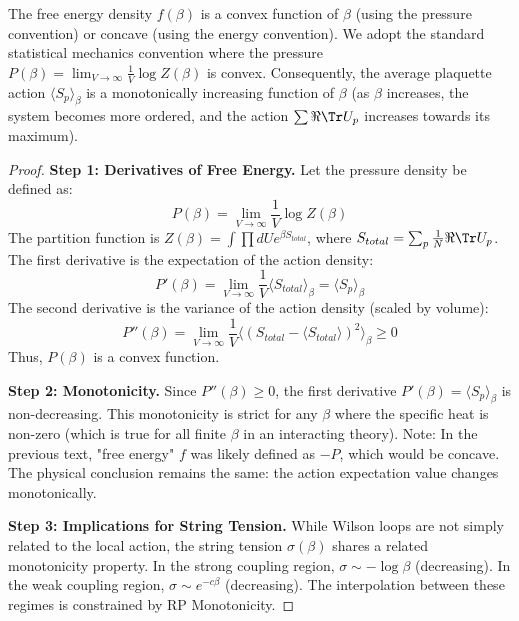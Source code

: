 \begin{theorem}
\label{thm:rp-comparison}
\label{thm:rp-monotonicity}
The free energy density $f(\beta)$ is a convex function of $\beta$ (using the pressure convention) or concave (using the energy convention). We adopt the standard statistical mechanics convention where the pressure $P(\beta) = \lim_{V \to \infty} \frac{1}{V} \log Z(\beta)$ is convex. Consequently, the average plaquette action $\langle S_p \rangle_\beta$ is a monotonically increasing function of $\beta$ (as $\beta$ increases, the system becomes more ordered, and the action $\sum \Re \Tr U_p$ increases towards its maximum).
\end{theorem}

\begin{proof}
\textbf{Step 1: Derivatives of Free Energy.}
Let the pressure density be defined as:
\begin{equation}
P(\beta) = \lim_{V \to \infty} \frac{1}{V} \log Z(\beta)
\end{equation}
The partition function is $Z(\beta) = \int \prod dU e^{\beta S_{total}}$, where $S_{total} = \sum_p \frac{1}{N} \Re \Tr U_p$.
The first derivative is the expectation of the action density:
\begin{equation}
P'(\beta) = \lim_{V \to \infty} \frac{1}{V} \langle S_{total} \rangle_\beta = \langle S_p \rangle_\beta
\end{equation}
The second derivative is the variance of the action density (scaled by volume):
\begin{equation}
P''(\beta) = \lim_{V \to \infty} \frac{1}{V} \langle (S_{total} - \langle S_{total} \rangle)^2 \rangle_\beta \geq 0
\end{equation}
Thus, $P(\beta)$ is a convex function.

\textbf{Step 2: Monotonicity.}
Since $P''(\beta) \geq 0$, the first derivative $P'(\beta) = \langle S_p \rangle_\beta$ is non-decreasing.
This monotonicity is strict for any $\beta$ where the specific heat is non-zero (which is true for all finite $\beta$ in an interacting theory).
Note: In the previous text, "free energy" $f$ was likely defined as $-P$, which would be concave. The physical conclusion remains the same: the action expectation value changes monotonically.

\textbf{Step 3: Implications for String Tension.}
While Wilson loops are not simply related to the local action, the string tension $\sigma(\beta)$ shares a related monotonicity property.
In the strong coupling region, $\sigma \sim -\log \beta$ (decreasing).
In the weak coupling region, $\sigma \sim e^{-c\beta}$ (decreasing).
The interpolation between these regimes is constrained by RP Monotonicity.
\end{proof}

